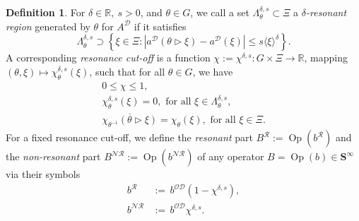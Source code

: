 \documentclass[10pt]{amsart}
\theoremstyle{definition}\newtheorem{defi}[theo]{Definition}\newtheorem{rema}[theo]{Remark}\newtheorem{exam}[theo]{Example}\newtheorem{nota}[theo]{Notation}
\DeclareMathOperator{\Op}{Op}
\newcommand{\R}{\mathbb R}
\newcommand{\CD}{\mathcal{D}}
\newcommand{\CN}{\mathcal{N}}
\newcommand{\CO}{\mathcal{O}}
\newcommand{\CR}{\mathcal{R}}
\newcommand{\CNR}{{\CN\!\CR}}
\newcommand{\BS}{\mathbf S}
\newcommand{\resc}{s}
\newcommand{\rco}{\chi}
\newcommand{\act}{\triangleright}
\renewcommand{\subseteq}{\subset}
\renewcommand{\supseteq}{\supset}
\newcommand{\abs}[1]{\left\lvert #1 \right\rvert}
\newcommand{\set}[1]{\left\{ #1 \right\}}
\newcommand{\ang}[1]{\langle #1 \rangle}
\begin{document}
\begin{defi}\label{def:resonant}
For $\delta \in \R,\ \resc>0$, and $\theta \in G$, we call a set $\Lambda_\theta^{\delta,\resc}\subseteq \Xi$ a $\delta$\emph{-resonant region} generated by $\theta$ for $A^\CD$ if it satisfies
\begin{equation}\label{eq:resonantregion}
\Lambda_\theta^{\delta,\resc} \supseteq \set{\xi \in \Xi : \abs{a^\CD(\theta\act\xi) - a^\CD(\xi)} \leq \resc \ang \xi^\delta}.
\end{equation}
A corresponding \emph{resonance cut-off} is a function $\rco :=\rco^{\delta, s} : G\times\Xi \to \R$, mapping $(\theta,\xi)\mapsto \rco_\theta^{\delta, s}(\xi)$, such that for all $\theta\in G$, we have
\begin{equation}\label{eq:dennonres}
\begin{gathered}
0\leq \rco \leq 1,\\
\rco_{\theta}^{\delta,s}(\xi)=0,\text{ for all }\xi\in\Lambda_\theta^{\delta,s},\\
\overline{\rco_{\theta^{-1}}(\theta\act\xi)}=\rco_\theta(\xi),\text{ for all }\xi\in\Xi.
\end{gathered}
\end{equation}
For a fixed resonance cut-off, we define the \emph{resonant} part $B^{\CR}:=\Op(b^{\CR})$ and the \emph{non-resonant} part $B^{\CNR}:=\Op(b^{\CNR})$ of any operator $B=\Op(b)\in\BS^\infty$ via their symbols
\begin{equation}\label{eq:resnonres}
\begin{aligned}
b^\CR &{:=}\, b^{\CO\CD}\left(1 - \rco^{\delta,s}\right), \\
b^{\CNR} &{:=}\, b^{\CO\CD}\rco^{\delta,s}.
\end{aligned}
\end{equation}
\end{defi}
\end{document}
